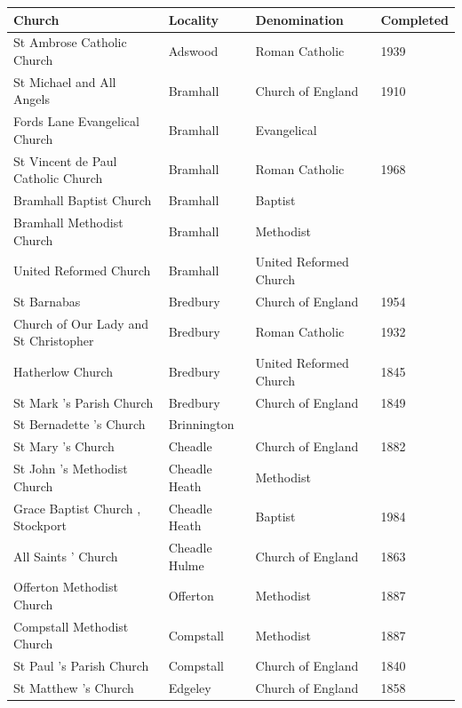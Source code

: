 \documentclass{article}
\begin{document}
\begin{tabular}{llll}
\toprule
Church & Locality & Denomination & Completed \\
\midrule
St Ambrose Catholic Church & Adswood & Roman Catholic & 1939 \\
St Michael and All Angels & Bramhall & Church of England & 1910 \\
Fords Lane Evangelical Church & Bramhall & Evangelical &  \\
St Vincent de Paul Catholic Church & Bramhall & Roman Catholic & 1968 \\
Bramhall Baptist Church & Bramhall & Baptist &  \\
Bramhall Methodist Church & Bramhall & Methodist &  \\
United Reformed Church & Bramhall & United Reformed Church &  \\
St Barnabas & Bredbury & Church of England & 1954 \\
Church of Our Lady and St Christopher & Bredbury & Roman Catholic & 1932 \\
Hatherlow Church & Bredbury & United Reformed Church & 1845 \\
St Mark 's Parish Church & Bredbury & Church of England & 1849 \\
St Bernadette 's Church & Brinnington &  &  \\
St Mary 's Church & Cheadle & Church of England & 1882 \\
St John 's Methodist Church & Cheadle Heath & Methodist &  \\
Grace Baptist Church , Stockport & Cheadle Heath & Baptist & 1984 \\
All Saints ' Church & Cheadle Hulme & Church of England & 1863 \\
Offerton Methodist Church & Offerton & Methodist & 1887 \\
Compstall Methodist Church & Compstall & Methodist & 1887 \\
St Paul 's Parish Church & Compstall & Church of England & 1840 \\
St Matthew 's Church & Edgeley & Church of England & 1858 \\
\bottomrule
\end{tabular}
\end{document}
